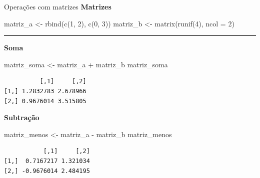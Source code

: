 \documentclass[
  10pt,
  ignorenonframetext,
]{beamer}
\newenvironment{Shaded}{\begin{snugshade}}{\end{snugshade}}
\newcommand{\AttributeTok}[1]{\textcolor[rgb]{0.40,0.45,0.13}{#1}}
\newcommand{\DecValTok}[1]{\textcolor[rgb]{0.68,0.00,0.00}{#1}}
\newcommand{\FunctionTok}[1]{\textcolor[rgb]{0.28,0.35,0.67}{#1}}
\newcommand{\NormalTok}[1]{\textcolor[rgb]{0.00,0.23,0.31}{#1}}
\newcommand{\OtherTok}[1]{\textcolor[rgb]{0.00,0.23,0.31}{#1}}
\newcommand{\SpecialCharTok}[1]{\textcolor[rgb]{0.37,0.37,0.37}{#1}}
\newcommand*{\regrafina}{\rule{\textwidth}{0.5pt}}
\begin{document}
\begin{frame}[fragile]{Operações com matrizes}
\protect\hypertarget{operauxe7uxf5es-com-matrizes}{}
\textbf{Matrizes}

\begin{Shaded}
\begin{Highlighting}[]
\NormalTok{matriz\_a }\OtherTok{\textless{}{-}} \FunctionTok{rbind}\NormalTok{(}\FunctionTok{c}\NormalTok{(}\DecValTok{1}\NormalTok{, }\DecValTok{2}\NormalTok{), }\FunctionTok{c}\NormalTok{(}\DecValTok{0}\NormalTok{, }\DecValTok{3}\NormalTok{))}
\NormalTok{matriz\_b }\OtherTok{\textless{}{-}} \FunctionTok{matrix}\NormalTok{(}\FunctionTok{runif}\NormalTok{(}\DecValTok{4}\NormalTok{), }\AttributeTok{ncol =} \DecValTok{2}\NormalTok{)}
\end{Highlighting}
\end{Shaded}

\regrafina

\small

\textbf{Soma}

\begin{Shaded}
\begin{Highlighting}[]
\NormalTok{matriz\_soma }\OtherTok{\textless{}{-}}\NormalTok{ matriz\_a }\SpecialCharTok{+}\NormalTok{ matriz\_b}
\NormalTok{matriz\_soma}
\end{Highlighting}
\end{Shaded}

\begin{verbatim}
          [,1]     [,2]
[1,] 1.2832783 2.678966
[2,] 0.9676014 3.515805
\end{verbatim}

\textbf{Subtração}

\begin{Shaded}
\begin{Highlighting}[]
\NormalTok{matriz\_menos }\OtherTok{\textless{}{-}}\NormalTok{ matriz\_a }\SpecialCharTok{{-}}\NormalTok{ matriz\_b}
\NormalTok{matriz\_menos}
\end{Highlighting}
\end{Shaded}

\begin{verbatim}
           [,1]     [,2]
[1,]  0.7167217 1.321034
[2,] -0.9676014 2.484195
\end{verbatim}

\normalsize
\end{frame}
\end{document}
